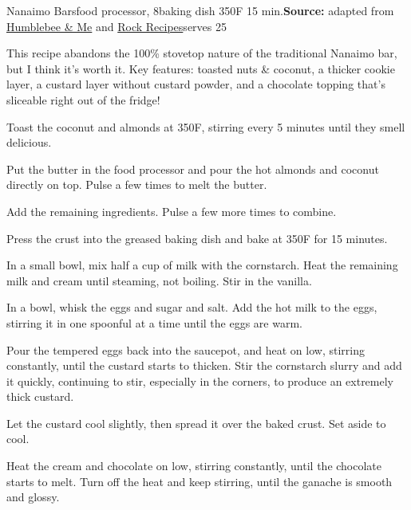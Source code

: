 \begin{recipe}[Nanaimo]{Nanaimo Bars}{food processor, 8\inch{}\inch baking dish \hfill 350\0F \hfill 15 min.}{\textbf{Source:} adapted from \href{https://www.humblebeeandme.com/totally-from-scratch-nanaimo-bars/}{Humblebee \& Me} and \href{https://www.rockrecipes.com/chocolate-mint-nanaimo-bars/}{Rock Recipes}\hfill serves 25}

 \freeform This recipe abandons the 100\% stovetop nature of the traditional Nanaimo bar, but I think it's worth it. Key features: toasted nuts \& coconut, a thicker cookie layer, a custard layer without custard powder, and a chocolate topping that's sliceable right out of the fridge!

 Toast the coconut and almonds at 350\0F, stirring every 5 minutes until they smell delicious.

 Put the butter in the food processor and pour the hot almonds and coconut directly on top. Pulse a few times to melt the butter.

 Add the remaining ingredients. Pulse a few more times to combine.

 \newstep Press the crust into the greased baking dish and bake at 350\0F for 15 minutes.

 In a small bowl, mix half a cup of milk with the cornstarch. Heat the remaining milk and cream until steaming, not boiling. Stir in the vanilla.

 In a bowl, whisk the eggs and sugar and salt. Add the hot milk to the eggs, stirring it in one spoonful at a time until the eggs are warm.

 \newstep Pour the tempered eggs back into the saucepot, and heat on low, stirring constantly, until the custard starts to thicken. Stir the cornstarch slurry and add it quickly, continuing to stir, especially in the corners, to produce an extremely thick custard.

 \newstep Let the custard cool slightly, then spread it over the baked crust. Set aside to cool.

 Heat the cream and chocolate on low, stirring constantly, until the chocolate starts to melt. Turn off the heat and keep stirring, until the ganache is smooth and glossy.


\end{recipe}
